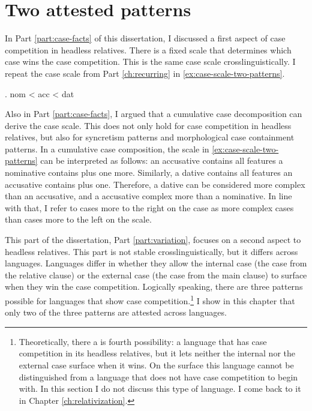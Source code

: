 
\chapter{Two attested patterns}

In Part \ref{part:case-facts} of this dissertation, I discussed a first aspect of case competition in headless relatives. There is a fixed scale that determines which case wins the case competition. This is the same case scale crosslinguistically. I repeat the case scale from Part \ref{ch:recurring} in \ref{ex:case-scale-two-patterns}.

\ex. \ac{nom} < \ac{acc} < \ac{dat}\label{ex:case-scale-two-patterns}

Also in Part \ref{part:case-facts}, I argued that a cumulative case decomposition can derive the case scale. This does not only hold for case competition in headless relatives, but also for syncretism patterns and morphological case containment patterns. In a cumulative case composition, the scale in \ref{ex:case-scale-two-patterns} can be interpreted as follows: an accusative contains all features a nominative contains plus one more. Similarly, a dative contains all features an accusative contains plus one. Therefore, a dative can be considered more complex than an accusative, and a accusative complex more than a nominative. In line with that, I refer to cases more to the right on the case as more complex cases than cases more to the left on the scale.

This part of the dissertation, Part \ref{part:variation}, focuses on a second aspect to headless relatives. This part is not stable crosslinguistically, but it differs across languages. Languages differ in whether they allow the internal case (the case from the relative clause) or the external case (the case from the main clause) to surface when they win the case competition. Logically speaking, there are three patterns possible for languages that show case competition.\footnote{
Theoretically, there a is fourth possibility: a language that has case competition in its headless relatives, but it lets neither the internal nor the external case surface when it wins. On the surface this language cannot be distinguished from a language that does not have case competition to begin with. In this section I do not discuss this type of language. I come back to it in Chapter \ref{ch:relativization}.
}
I show in this chapter that only two of the three patterns are attested across languages.


